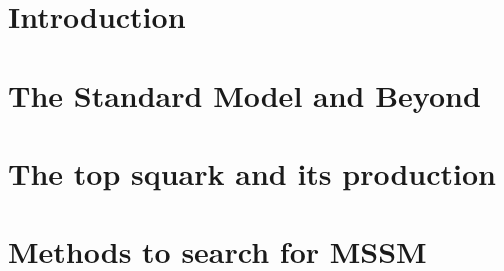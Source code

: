 \documentclass[12pt,a4paper]{report}
\begin{document}
\tableofcontents
\clearpage

\pagestyle{fancy}
\fancyhead[L]{\empty}
\setlength{\headheight}{27pt} %

\setcounter{page}{1}

\chapter{Introduction}



\chapter{The Standard Model and Beyond}
\label{chap:2}


\chapter{The top squark and its production}
\label{chap:3}


\chapter{Methods to search for MSSM}
\label{chap:4}

\end{document}
